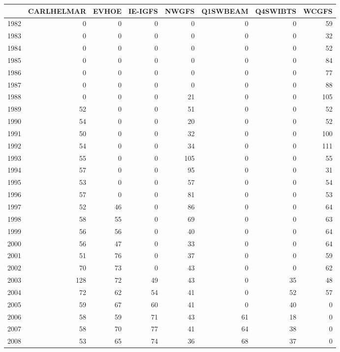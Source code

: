 \documentclass[12pt]{article}\usepackage[]{graphicx}\usepackage[]{color}
\newenvironment{knitrout}{}{} %
\begin{document}
\begin{knitrout}\footnotesize
{}\color{fgcolor}
\begin{tabular}{l|r|r|r|r|r|r|r}
\hline
  & CARLHELMAR & EVHOE & IE-IGFS & NWGFS & Q1SWBEAM & Q4SWIBTS & WCGFS\\
\hline
1982 & 0 & 0 & 0 & 0 & 0 & 0 & 59\\
\hline
1983 & 0 & 0 & 0 & 0 & 0 & 0 & 32\\
\hline
1984 & 0 & 0 & 0 & 0 & 0 & 0 & 52\\
\hline
1985 & 0 & 0 & 0 & 0 & 0 & 0 & 84\\
\hline
1986 & 0 & 0 & 0 & 0 & 0 & 0 & 77\\
\hline
1987 & 0 & 0 & 0 & 0 & 0 & 0 & 88\\
\hline
1988 & 0 & 0 & 0 & 21 & 0 & 0 & 105\\
\hline
1989 & 52 & 0 & 0 & 51 & 0 & 0 & 52\\
\hline
1990 & 54 & 0 & 0 & 20 & 0 & 0 & 52\\
\hline
1991 & 50 & 0 & 0 & 32 & 0 & 0 & 100\\
\hline
1992 & 54 & 0 & 0 & 34 & 0 & 0 & 111\\
\hline
1993 & 55 & 0 & 0 & 105 & 0 & 0 & 55\\
\hline
1994 & 57 & 0 & 0 & 95 & 0 & 0 & 31\\
\hline
1995 & 53 & 0 & 0 & 57 & 0 & 0 & 54\\
\hline
1996 & 57 & 0 & 0 & 81 & 0 & 0 & 53\\
\hline
1997 & 52 & 46 & 0 & 86 & 0 & 0 & 64\\
\hline
1998 & 58 & 55 & 0 & 69 & 0 & 0 & 63\\
\hline
1999 & 56 & 56 & 0 & 40 & 0 & 0 & 64\\
\hline
2000 & 56 & 47 & 0 & 33 & 0 & 0 & 64\\
\hline
2001 & 51 & 76 & 0 & 37 & 0 & 0 & 59\\
\hline
2002 & 70 & 73 & 0 & 43 & 0 & 0 & 62\\
\hline
2003 & 128 & 72 & 49 & 43 & 0 & 35 & 48\\
\hline
2004 & 72 & 62 & 54 & 41 & 0 & 52 & 57\\
\hline
2005 & 59 & 67 & 60 & 41 & 0 & 40 & 0\\
\hline
2006 & 58 & 59 & 71 & 43 & 61 & 18 & 0\\
\hline
2007 & 58 & 70 & 77 & 41 & 64 & 38 & 0\\
\hline
2008 & 53 & 65 & 74 & 36 & 68 & 37 & 0\\

\end{tabular}
\end{knitrout}
\end{document}
